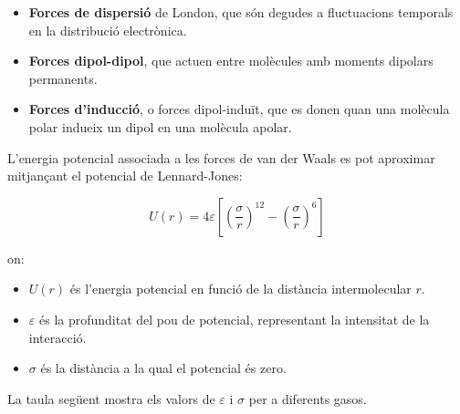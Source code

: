 \begin{itemize}
    \item {\bf Forces de dispersió} de London, que són degudes a fluctuacions temporals en la distribució electrònica.
    \item  {\bf Forces dipol-dipol}, que actuen entre molècules amb moments dipolars permanents.
    \item {\bf Forces d'inducció}, o forces dipol-induït, que es donen quan una molècula polar indueix un dipol en una molècula apolar.
\end{itemize}

L'energia potencial associada a les forces de van der Waals es pot aproximar mitjançant el potencial de Lennard-Jones:  

\begin{equation}
    U(r) = 4 \varepsilon \left[ \left( \frac{\sigma}{r} \right)^{12} - \left( \frac{\sigma}{r} \right)^{6} \right]
\end{equation}

on:
\begin{itemize}
    \item \( U(r) \) és l'energia potencial en funció de la distància intermolecular \( r \).
    \item \( \varepsilon \) és la profunditat del pou de potencial, representant la intensitat de la interacció.
    \item \( \sigma \) és la distància a la qual el potencial és zero.
\end{itemize}

La taula següent mostra els valors de \( \varepsilon \) i \( \sigma \) per a diferents gasos.


